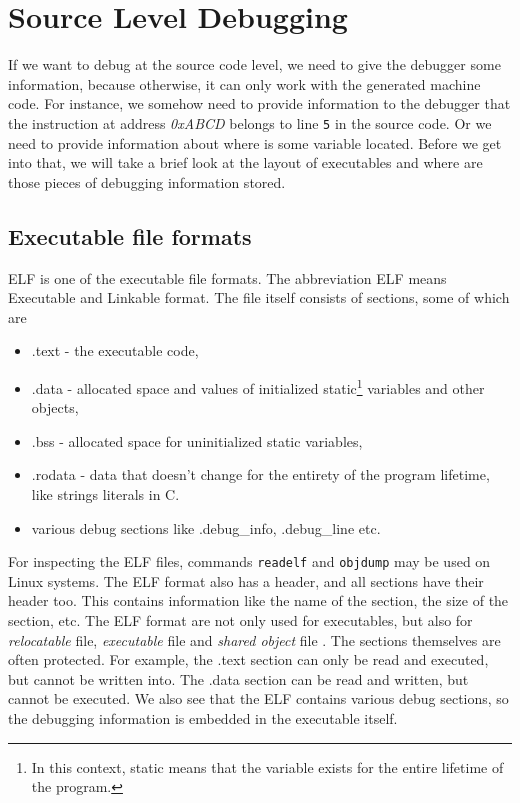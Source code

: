\section{Source Level Debugging}
If we want to debug at the source code level, we need to give the debugger some
information, because otherwise, it can only work with the generated machine
code. For instance, we somehow need to provide information to the debugger that
the instruction at address \textit{0xABCD} belongs to line \texttt{5} in the
source code. Or we need to provide information about where is some variable
located. Before we get into that, we will take a brief look at the layout of
executables and where are those pieces of debugging information stored.

\subsection{Executable file formats}
ELF is one of the executable file formats. The abbreviation ELF means
Executable and Linkable format. The file itself consists of sections, some of
which are
\begin{itemize}
    \item .text - the executable code,
    \item .data - allocated space and values of initialized static\footnote{In
        this context, static means that the variable exists for the entire
        lifetime of the program.} variables and other objects,
    \item .bss - allocated space for uninitialized static variables,
    \item .rodata - data that doesn't change for the entirety of the program
        lifetime, like strings literals in C.
    \item various debug sections like .debug\_info, .debug\_line etc.
\end{itemize}
For inspecting the ELF files, commands \texttt{readelf} and \texttt{objdump}
may be used on Linux systems. The ELF format also has a header, and all
sections have their header too. This contains information like the name of the
section, the size of the section, etc. The ELF format are not only used for
executables, but also for \textit{relocatable} file, \textit{executable} file
and \textit{shared object} file \cite{elf}. The sections themselves are often
protected. For example, the .text section can only be read and executed, but
cannot be written into. The .data section can be read and written, but cannot
be executed. We also see that the ELF contains various debug sections, so the
debugging information is embedded in the executable itself.

